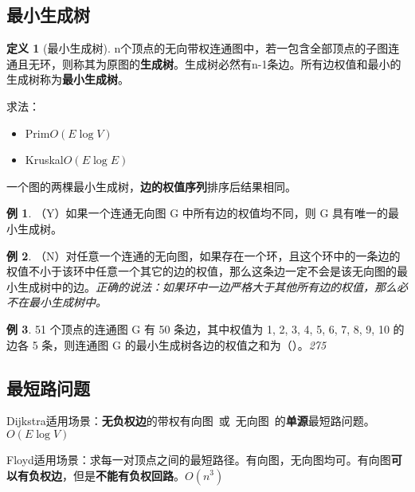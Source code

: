\documentclass[hyperref,a4paper,UTF8,12pt]{ctexart}
\theoremstyle{definition}
\newtheorem{definition}[theorem]{定义}
\newtheorem{example}{例}[section]
\begin{document}
\subsection{最小生成树}
\begin{definition}[最小生成树]
    n个顶点的无向带权连通图中，若一包含全部顶点的子图连通且无环，则称其为原图的\textbf{生成树}。生成树必然有n-1条边。所有边权值和最小的生成树称为\textbf{最小生成树}。
\end{definition}
求法：
\begin{itemize}
    \item Prim\quad $O(E\log V)$
    \item Kruskal\quad $O(E\log E)$
\end{itemize}
一个图的两棵最小生成树，\textbf{边的权值序列}排序后结果相同。
\begin{example}
    （Y）如果一个连通无向图 G 中所有边的权值均不同，则 G 具有唯一的最小生成树。
\end{example}
\begin{example}
    （N）对任意一个连通的无向图，如果存在一个环，且这个环中的一条边的权值不小于该环中任意一个其它的边的权值，那么这条边一定不会是该无向图的最小生成树中的边。\quad\textit{正确的说法：如果环中一边严格大于其他所有边的权值，那么必不在最小生成树中。}
\end{example}
\begin{example}
    51 个顶点的连通图 G 有 50 条边，其中权值为 1, 2, 3, 4, 5, 6, 7, 8, 9, 10 的边各 5 条，则连通图 G 的最小生成树各边的权值之和为（\quad）。\textit{275}
\end{example}

\subsection{最短路问题}
Dijkstra适用场景：\textbf{无负权边}的带权有向图\ 或\ 无向图\ 的\textbf{单源}最短路问题。$O(E\log V)$

Floyd适用场景：求每一对顶点之间的最短路径。有向图，无向图均可。有向图\textbf{可以有负权边}，但是\textbf{不能有负权回路}。$O(n^3)$
\end{document}
